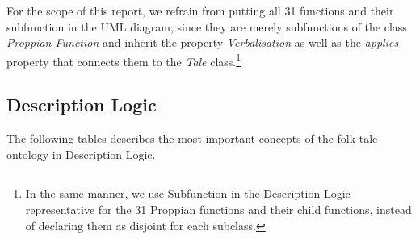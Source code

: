 \documentclass[10pt,a4paper]{article}
\begin{document}
For the scope of this report, we refrain from putting all 31 functions and their subfunction in the UML diagram, since they are merely subfunctions of the class \textit{Proppian Function} and inherit the property \textit{Verbalisation} as well as the \textit{applies} property that connects them to the \textit{Tale} class.\footnote{In the same manner, we use Subfunction in the Description Logic representative for the 31 Proppian functions and their child functions, instead of declaring them as disjoint for each subclass.}  

\subsection{Description Logic}

The following tables describes the most important concepts of the folk tale ontology in Description Logic.
\\
 
\end{document}
